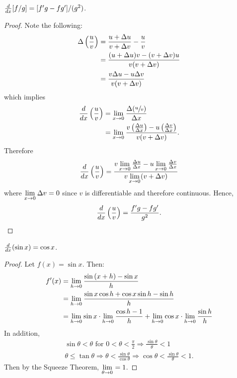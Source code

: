 \documentclass[a4paper,8pt]{article}
\begin{document}
\begin{outline}
    \(\frac{d}{dx}[f/g] = [f'g-fg']/(g^2)\).

    \begin{proof}
      Note the following:
      \begin{align*}
        \Delta \left(\frac{u}{v}\right)
          &=\frac{u+\Delta u}{v+\Delta v} - \frac{u}{v}\\
          &=\frac{(u+\Delta u)v-(v+\Delta v)u}{v(v+\Delta v)}\\
          &=\frac{v\Delta u-u\Delta v}{v(v+\Delta v)}\\
      \end{align*}
      which implies
      \begin{align*}
        \frac{d}{dx}\left(\frac{u}{v}\right)
          &= \lim\limits_{x\rightarrow 0^{}}\frac{\Delta(\sfrac{u}{v})}{\Delta x}\\
          &= \lim\limits_{x\rightarrow 0^{}}\frac{v\left(\frac{\Delta u}{\Delta x}\right) -
             u\left(\frac{\Delta v}{\Delta x}\right)}{v(v+\Delta v)}\text{.}
      \end{align*}
      Therefore
      \[
        \frac{d}{dx}\left(\frac{u}{v}\right)
          = \frac{v\lim\limits_{x\rightarrow 0^{}}\frac{\Delta u}{\Delta x}-u\lim\limits_{x\rightarrow 0^{}}\frac{\Delta v}{\Delta x}}{v\lim\limits_{x\rightarrow 0^{}}(v+\Delta v)}
      \]
      where \(\lim\limits_{x\rightarrow 0^{}} \Delta v = 0\) since \(v\) is differentiable and therefore continuous. Hence,
      \[
        \frac{d}{dx}\left(\frac{u}{v}\right) = \frac{f'g-fg'}{g^2}\text{.}
      \]
    \end{proof}

    \(\frac{d}{dx}(\sin{x}) = \cos{x}\).

    \begin{proof}
      Let \(f(x) = \sin{x}\). Then:
      \begin{align*}
        f'(x) &= \lim\limits_{h\rightarrow 0^{}}\frac{\sin{(x+h)}-\sin{x}}{h}\\
              &= \lim\limits_{h\rightarrow 0^{}}\frac{\sin{x}\cos{h}+\cos{x}\sin{h}-\sin{h}}{h}\\
              &= \lim\limits_{h\rightarrow 0^{}}\sin{x}\cdot\lim\limits_{h\rightarrow 0^{}}\frac{\cos{h}-1}{h} +
                 \lim\limits_{h\rightarrow 0^{}}\cos{x}\cdot\lim\limits_{h\rightarrow 0^{}}\frac{\sin{h}}{h}
      \end{align*}
      In addition,
      \begin{gather*}
        \sin{\theta}<\theta\text{ for }0<\theta<\frac{\pi}{2}\Rightarrow\frac{\sin{\theta}}{\theta}<1\\
        \theta\leq\tan{\theta}\Rightarrow\theta<\frac{\sin{\theta}}{\cos{\theta}}
          \Rightarrow\cos{\theta}<\frac{\sin{\theta}}{\theta}<1\text{.}
      \end{gather*}
      Then by the Squeeze Theorem, \(\lim\limits_{\theta\rightarrow 0^{}} = 1\).


\end{proof}
\end{outline}
\end{document}
